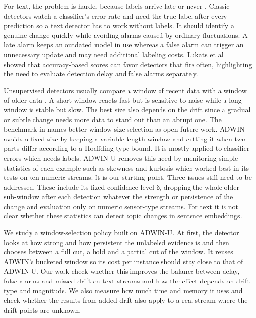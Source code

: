 \documentclass[conference]{IEEEtran}
\begin{document}
For text, the problem is harder because labels arrive late or never \cite{garcia2024review}. Classic detectors watch a classifier's error rate and need the true label after every prediction \cite{gama2004,bifet2007} so a text detector has to work without labels. It should identify a genuine change quickly while avoiding alarms caused by ordinary fluctuations. A late alarm keeps an outdated model in use whereas a false alarm can trigger an unnecessary update and may need additional labeling costs. Lukats et al.\ \cite{lukats2025} showed that accuracy-based scores can favor detectors that fire often, highlighting the need to evaluate detection delay and false alarms separately.

Unsupervised detectors usually compare a window of recent data with a window of older data \cite{hinder2024a}. A short window reacts fast but is sensitive to noise while a long window is stable but slow. The best size also depends on the drift since a gradual or subtle change needs more data to stand out than an abrupt one. The benchmark in \cite{lukats2025} names better window-size selection as open future work.
ADWIN \cite{bifet2007} avoids a fixed size by keeping a variable-length window and cutting it when two parts differ according to a Hoeffding-type bound. It is mostly applied to classifier errors which needs labels. ADWIN-U \cite{assis2025} removes this need by monitoring simple statistics of each example such as skewness and kurtosis which worked best in its tests on ten numeric streams. It is our starting point. Three issues still need to be addressed. These include its fixed confidence level δ, dropping the whole older sub-window after each detection whatever the strength or persistence of the change and evaluation only on numeric sensor-type streams. For text it is not clear whether these statistics can detect topic changes in sentence embeddings.

We study a window-selection policy built on ADWIN-U. At first, the detector looks at how strong and how persistent the unlabeled evidence is and then chooses between a full cut, a hold and a partial cut of the window. It reuses ADWIN's bucketed window so its cost per instance should stay close to that of ADWIN-U. Our work check whether this improves the balance between delay, false alarms and missed drift on text streams and how the effect depends on drift type and magnitude. We also measure how much time and memory it uses and check whether the results from added drift also apply to a real stream where the drift points are unknown.
\end{document}
